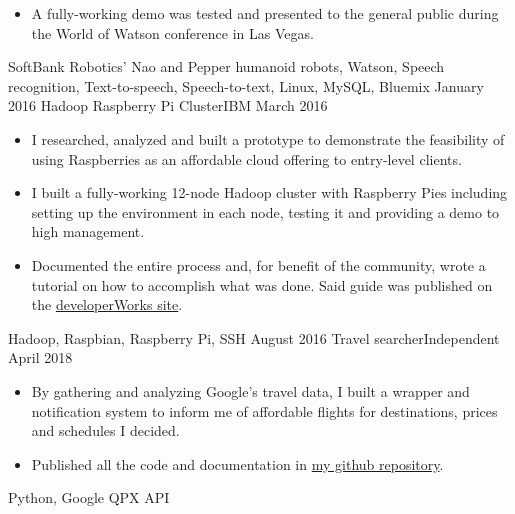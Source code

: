 \begin{projects}
{\begin{itemize}
                        \item A fully-working demo was tested and presented to 
                        the general public during the World of Watson 
                        conference in Las Vegas.
                      \end{itemize}
                    }
                    {SoftBank Robotics' Nao and Pepper humanoid robots, Watson, 
                    Speech recognition, Text-to-speech, Speech-to-text, Linux, 
                    MySQL, Bluemix}
  \emptySeparator
  \project
  {January 2016}  {Hadoop Raspberry Pi Cluster}{IBM}
  {March 2016}   {
                      \begin{itemize}
                        \item I researched, analyzed and built a prototype to 
                        demonstrate the feasibility of using Raspberries as an 
                        affordable cloud offering to entry-level clients.
                        \item I built a fully-working 12-node Hadoop cluster 
                        with Raspberry Pies including setting up the 
                        environment in each node, testing it and providing a 
                        demo to high management.
                        \item Documented the entire process and, for benefit 
                        of the community, wrote a tutorial on how to 
                        accomplish what was done. Said guide was published on 
                        the 
                        \href{https://developer.ibm.com/recipes/tutorials/building-a-hadoop-cluster-with-raspberry-pi/}
                        {developerWorks site}.
                      \end{itemize}
                  }
                  {Hadoop, Raspbian, Raspberry Pi, SSH}
  \emptySeparator
  \project
  {August 2016}  {Travel searcher}{Independent}
  {April 2018}   {
                      \begin{itemize}
                        \item By gathering and analyzing Google's travel data, 
                        I built a wrapper and notification system to inform me 
                        of affordable flights for destinations, prices and 
                        schedules I decided.
                        \item Published all the code and documentation in 
                        \href{https://github.com/alanverdugo/QPX}
                        {my github repository}.
                      \end{itemize}
                  }
                  {Python, Google QPX API}
\end{projects}

